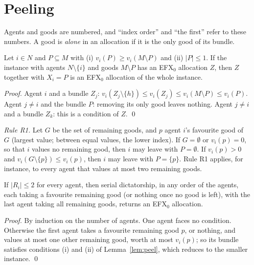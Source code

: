 \documentclass[runningheads,11pt]{llncs}
\newcommand{\efxz}{\texorpdfstring{\mbox{EFX$_0$}}{EFX0}}
\begin{document}
\section{Peeling}\label{sec:peel}

Agents and goods are numbered, and ``index order'' and ``the first'' refer to these numbers. A good is \emph{alone} in an allocation if it is the only good of its bundle.

\begin{lemma}[peeling]\label{lem:peel}
Let $i\in N$ and $P\subseteq M$ with (i) $v_i(P)\ge v_i(M\setminus P)$ and (ii) $|P|\le1$. If the instance with agents $N\setminus\{i\}$ and goods $M\setminus P$ has an \efxz{} allocation $Z$, then $Z$ together with $X_i=P$ is an \efxz{} allocation of the whole instance.
\end{lemma}

\begin{proof}
Agent $i$ and a bundle $Z_j$: $v_i(Z_j\setminus\{h\})\le v_i(Z_j)\le v_i(M\setminus P)\le v_i(P)$. Agent $j\ne i$ and the bundle $P$: removing its only good leaves nothing. Agent $j\ne i$ and a bundle $Z_k$: this is a condition of $Z$. \qed
\end{proof}

\noindent \emph{Rule R1.} Let $G$ be the set of remaining goods, and $p$ agent $i$'s favourite good of $G$ (largest value; between equal values, the lower index). If $G=\emptyset$ or $v_i(p)=0$, so that $i$ values no remaining good, then $i$ may leave with $P=\emptyset$. If $v_i(p)>0$ and $v_i(G\setminus\{p\})\le v_i(p)$, then $i$ may leave with $P=\{p\}$. Rule R1 applies, for instance, to every agent that values at most two remaining goods.

\begin{corollary}\label{cor:k2}
If $|R_i|\le2$ for every agent, then serial dictatorship, in any order of the agents, each taking a favourite remaining good (or nothing once no good is left), with the last agent taking all remaining goods, returns an \efxz{} allocation.
\end{corollary}

\begin{proof}
By induction on the number of agents. One agent faces no condition. Otherwise the first agent takes a favourite remaining good $p$, or nothing, and values at most one other remaining good, worth at most $v_i(p)$; so its bundle satisfies conditions (i) and (ii) of Lemma~\ref{lem:peel}, which reduces to the smaller instance. \qed
\end{proof}
\end{document}
